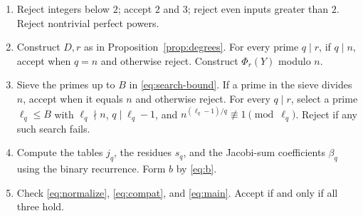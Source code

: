 \documentclass[11pt]{article}
\theoremstyle{definition}
\theoremstyle{remark}
\begin{document}
\begin{enumerate}
\item Reject integers below $2$; accept $2$ and $3$; reject even
      inputs greater than $2$. Reject nontrivial perfect powers.
\item Construct $D,r$ as in Proposition~\ref{prop:degrees}.
      For every prime $q\mid r$, if $q\mid n$, accept when $q=n$
      and otherwise reject. Construct $\Phi_r(Y)$ modulo $n$.
\item Sieve the primes up to $B$ in \eqref{eq:search-bound}.
      If a prime in the sieve divides $n$, accept when it equals
      $n$ and otherwise reject. For every $q\mid r$, select a prime
      $\ell_q\le B$ with $\ell_q\nmid n$, $q\mid\ell_q-1$, and
      $n^{(\ell_q-1)/q}\not\equiv1\pmod{\ell_q}$.
      Reject if any such search fails.
\item Compute the tables $j_q$, the residues $s_q$, and the
      Jacobi-sum coefficients $\beta_q$ using the binary recurrence.
      Form $b$ by \eqref{eq:b}.
\item Check \eqref{eq:normalize}, \eqref{eq:compat}, and
      \eqref{eq:main}. Accept if and only if all three hold.
\end{enumerate}
\end{document}
